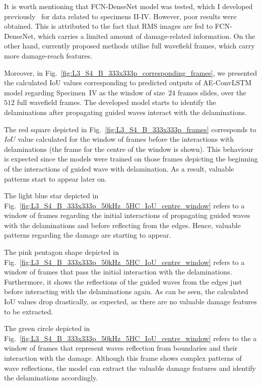 It is worth mentioning that FCN-DenseNet model was tested, which I developed previously~\cite{Ijjeh2021} for data related to specimens II-IV. 
However, poor results were obtained. 
This is attributed to the fact that RMS images are fed to FCN-DenseNet, which carries a limited amount of damage-related information. 
On the other hand, currently proposed methods utilise full wavefield frames, which carry more damage-reach features. 

Moreover, in Fig.~\ref{fig:L3_S4_B_333x333p_corresponding_frames}, we presented the calculated IoU values corresponding to predicted outputs of AE-ConvLSTM model regarding Specimen~IV as the window of size~\(24\) frames slides, over the \(512\) full wavefield frames.
The developed model starts to identify the delaminations after propagating guided waves interact with the delaminations.

The red square depicted in Fig.~\ref{fig:L3_S4_B_333x333p_frames} corresponds to \(IoU\) value calculated for the window of frames before the interactions with delaminations (the frame for the centre of the window is shown).
This behaviour is expected since the models were trained on those frames depicting the beginning of the interactions of guided wave with delamination. 
As a result, valuable patterns start to appear later on.

The light blue star depicted in Fig.~\ref{fig:L3_S4_B_333x333p_50kHz_5HC_IoU_centre_window} refers to a window of frames regarding the initial interactions of propagating guided waves with the delaminations and before reflecting from the edges.
Hence, valuable patterns regarding the damage are starting to appear.

The pink pentagon shape depicted in Fig.~\ref{fig:L3_S4_B_333x333p_50kHz_5HC_IoU_centre_window} refers to a window of frames that pass the initial interaction with the delaminations. 
Furthermore, it shows the reflections of the guided waves from the edges just before interacting with the delaminations again.
As can be seen, the calculated IoU values drop drastically, as expected, as there are no valuable damage features to be extracted.  

The green circle depicted in Fig.~\ref{fig:L3_S4_B_333x333p_50kHz_5HC_IoU_centre_window} refers to the a window of frames that represent waves reflection from boundaries and their interaction with the damage.
Although this frame shows complex patterns of wave reflections, the model can extract the valuable damage features and identify the delaminations accordingly.

